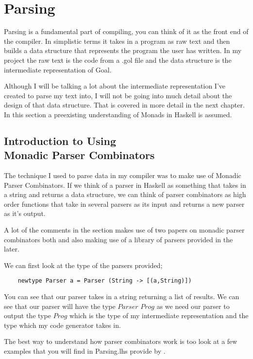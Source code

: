 
\chapter{Parsing}

Parsing is a fundamental part of compiling, you can think of it as the front end of the compiler. In simplistic terms it takes in a program as raw text and then builds a data structure that represents the program the user has written. In my project the raw text is the code from a .gol file and the data structure is the intermediate representation of Goal. 

Although I will be talking a lot about the intermediate representation I've created to parse my text into, I will not be going into much detail about the design of that data structure. That is covered in more detail in the next chapter. In this section a preexisting understanding of Monads in Haskell is assumed.      

\section[Introduction to Using Monadic Parser Combinators]{Introduction to Using \\ Monadic Parser Combinators}

The technique I used to parse data in my compiler was to make use of Monadic Parser Combinators. If we think of a parser in Haskell as something that takes in a string and returns a data structure, we can think of parser combinators as high order functions that take in several parsers as its input and returns a new parser as it's output. 

A lot of the comments in the section makes use of two papers on monadic parser combinators both \cite{Hutton96} and \cite{Hutton98} also making use of a library of parsers provided in the later. 

We can first look at the type of the parsers provided;

\begin{lstlisting}
	newtype Parser a = Parser (String -> [(a,String)])
\end{lstlisting}  

You can see that our parser takes in a string returning a list of results. We can see that our parser will have the type $Parser$ $Prog$ as we need our parser to output the type $Prog$ which is the type of my intermediate representation and the type which my code generator takes in. 

The best way to understand how parser combinators work is too look at a few examples that you will find in Parsing.lhs provide by \cite{Hutton98}.

